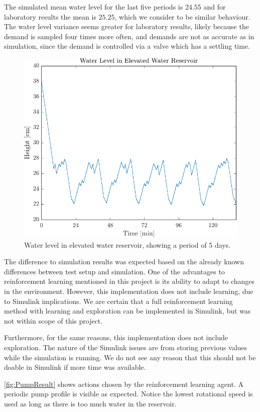 The simulated mean water level for the last five periods is $24.55$ and for laboratory results the mean is $25.25$, which we consider to be similar behaviour. The water level variance seems greater for laboratory results, likely because the demand is sampled four times more often, and demands are not as accurate as in simulation, since the demand is controlled via a valve which has a settling time.

\begin{figure}[h!]
	\centering
	\includegraphics[width=0.7\linewidth]{figures/ResultHeight.pdf}
	\caption{Water level in elevated water reservoir, showing a period of 5 days.}
	\label{fig:HtankResult}
\end{figure}

The difference to simulation results was expected based on the already known differences between test setup and simulation. One of the advantages to reinforcement learning mentioned in this project is its ability to adapt to changes in the environment. However, this implementation does not include learning, due to Simulink implications. We are certain that a full reinforcement learning method with learning and exploration can be implemented in Simulink, but was not within scope of this project.

Furthermore, for the same reasons, this implementation does not include exploration. The nature of the Simulink issues are from storing previous values while the simulation is running. We do not see any reason that this should not be doable in Simulink if more time was available. 

\cref{fig:PumpResult} shows actions chosen by the reinforcement learning agent. A  periodic pump profile is visible as expected. Notice the lowest rotational speed is used as long as there is too much water in the reservoir.

